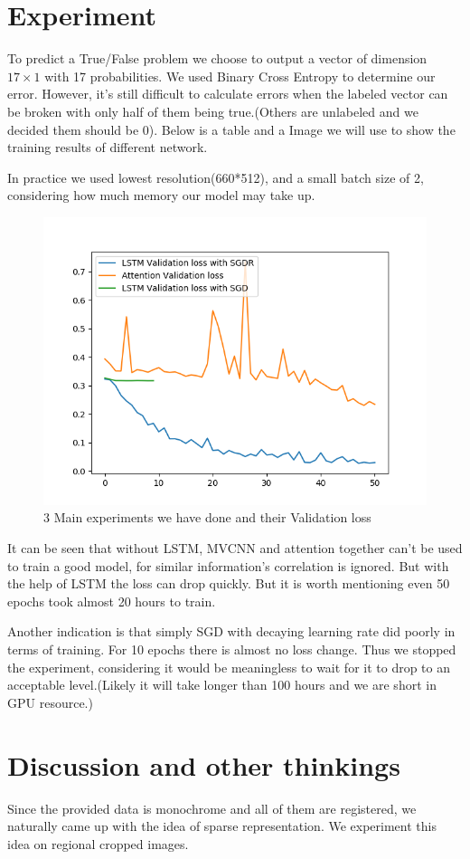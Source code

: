 \documentclass[conference,compsoc]{IEEEtran}
\begin{document}
\section{Experiment}
To predict a True/False problem we choose to output a vector of dimension $17 \times 1$ with 17 probabilities. 
We used Binary Cross Entropy to determine our error. However, it's still difficult to calculate errors when the labeled vector can be broken with only half of them being true.(Others are unlabeled and we decided them should be 0).
Below is a table and a Image we will use to show the training results of different network.
\par In practice we used lowest resolution(660*512), and a small batch size of 2, considering how much memory our model may take up.  
\begin{figure}[!tp]
	\includegraphics[width=.5\textwidth]{../Pic/3models}
	\caption{3 Main experiments we have done and their Validation loss}
\end{figure}
\par
It can be seen that without LSTM, MVCNN and attention together can't be used to train a good model, for similar information's correlation is ignored. But with the help of LSTM the loss can drop quickly. But it is worth mentioning even 50 epochs took almost 20 hours to train.
\par
Another indication is that simply SGD with decaying learning rate did poorly in terms of training. For 10 epochs there is almost no loss change. Thus we stopped the experiment, considering it would be meaningless to wait for it to drop to an acceptable level.(Likely it will take longer than 100 hours and we are short in GPU resource.)

\section{Discussion and other thinkings}
Since the provided data is monochrome and all of them are registered, we naturally came up with the idea of sparse representation. We experiment this idea on regional cropped images.
\end{document}
